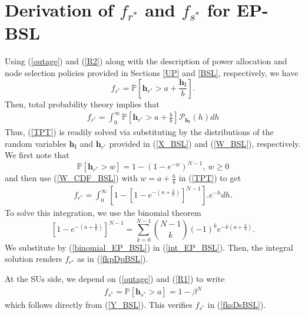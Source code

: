 \documentclass[journal,twocolumn]{IEEEtran}
\begin{document}
\section{Derivation of $f_{r^*}$ and $f_{s^*}$ for EP-BSL} \label{EP-BSL}
Using (\ref{outage}) and (\ref{R2}) along with the description of power allocation and node selection policies provided in Sections \ref{UP} and \ref{BSL}, respectively, we have
\begin{equation}\label{f}
f_{r^*}=\mathbb{P}\left[ \mathbf{h}_{r^*} > a+\frac{\mathbf{h}_{\mathrm{I}}}{b} \right].
\end{equation}
Then, total probability theory implies that
\begin{align}\label{TPT}
f_{r^*} =\int_{0}^{\infty} \mathbb{P} \left[ \mathbf{h}_{r^*} > a+ \frac{h}{b} \right]
\mathcal{P}_{\mathbf{h}_{\mathrm{I}}}(h)dh 
\end{align}
Thus, (\ref{TPT}) is readily solved via substituting by the distributions of the random variables $\mathbf{h}_{\mathrm{I}}$ and $\mathbf{h}_{r^*}$ provided in (\ref{X_BSL}) and (\ref{W_BSL}), respectively. We first note that 
\begin{equation}\label{W_CDF_BSL}
\mathbb{P}\left[ \mathbf{h}_{r^*} > w \right]=1-(1-e^{-w})^{N-1}, ~ w \geq 0
\end{equation}
and then use (\ref{W_CDF_BSL}) with $w=a+ \frac{h}{b}$ in (\ref{TPT}) to get
\begin{align}\label{int_EP_BSL}
f_{r^*} = \int_{0}^{\infty} 
\left[ 1 - \left[ 1-e^{-\left(a+\frac{h}{b}\right)} \right]^{N-1} \right].
e^{-h} dh. 
\end{align} 
To solve this integration, we use the binomial theorem
\begin{equation} \label{binomial_EP_BSL}
\left[ 1-e^{-\left(a+\frac{h}{b}\right)} \right]^{N-1} = 
\displaystyle \sum_{k=0}^{N-1} {N-1 \choose k} (-1)^{k} e^{-k\left(a+\frac{h}{b}\right)}. 
\end{equation} 
We substitute by (\ref{binomial_EP_BSL}) in (\ref{int_EP_BSL}). Then, the integral solution renders $f_{r^*}$ as in (\ref{fkpDpBSL}).

At the SUs side, we depend on (\ref{outage}) and (\ref{R1}) to write
\begin{align}\label{fsksDs_BSL}
f_{s^*}= \mathbb{P}\left[ \mathbf{h}_{s^*} > a \right]
=1-\beta^{N}
\end{align}
which follows directly from (\ref{Y_BSL}). This verifies $f_{s^*}$ in (\ref{fksDsBSL}).
\end{document}
